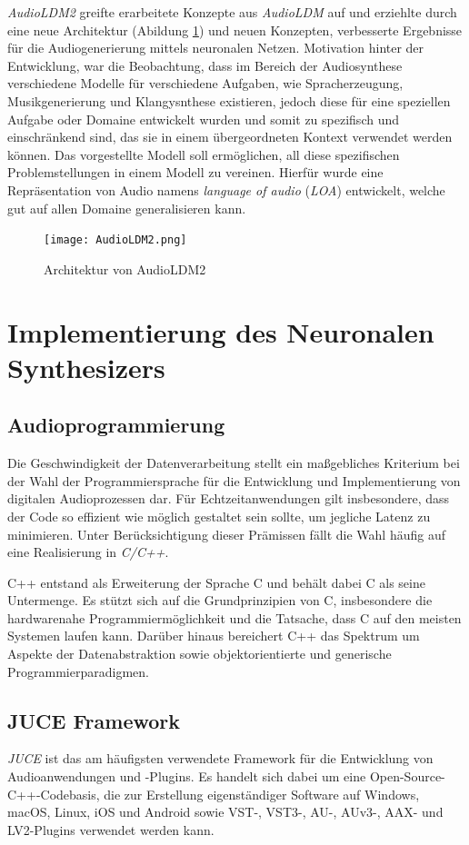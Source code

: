 \documentclass[
  a4paper,  %
  twoside,  %
  bibliography=totoc,
  headsepline,
  cleardoublepage=empty,
  parskip=half,
  draft=false
]{scrbook}
\begin{document}
\emph{AudioLDM2}\cite{liu_audioldm2_2023} greifte erarbeitete Konzepte aus \emph{AudioLDM}\cite{liu_audioldm_2023} auf und erziehlte durch eine neue Architektur (Abildung \ref{fig:AudioLDM2}) und neuen Konzepten, verbesserte Ergebnisse für die Audiogenerierung mittels neuronalen Netzen. Motivation hinter der Entwicklung, war die Beobachtung, dass im Bereich der Audiosynthese verschiedene Modelle für verschiedene Aufgaben, wie Spracherzeugung, Musikgenerierung und Klangysnthese existieren, jedoch diese für eine speziellen Aufgabe oder Domaine entwickelt wurden und somit zu spezifisch und einschränkend sind, das sie in einem übergeordneten Kontext verwendet werden können. Das vorgestellte Modell soll ermöglichen, all diese spezifischen Problemstellungen in einem Modell zu vereinen. Hierfür wurde eine Repräsentation von Audio namens \emph{language of audio} (\emph{LOA}) entwickelt, welche gut auf allen Domaine generalisieren kann.  
\begin{figure}[h]
  \centering
  \texttt{[image: AudioLDM2.png]}
  \caption[AudioLDM2 Architektur]{Architektur von AudioLDM2\cite{liu_audioldm2_2023}}
  \label{fig:AudioLDM2}
\end{figure} 


\section{Implementierung des Neuronalen Synthesizers}
\subsection{Audioprogrammierung}
Die Geschwindigkeit der Datenverarbeitung stellt ein maßgebliches Kriterium bei der Wahl der Programmiersprache für die Entwicklung und Implementierung von digitalen Audioprozessen dar. Für Echtzeitanwendungen gilt insbesondere, dass der Code so effizient wie möglich gestaltet sein sollte, um jegliche Latenz zu minimieren. Unter Berücksichtigung dieser Prämissen fällt die Wahl häufig auf eine Realisierung in \emph{C/C++}. \cite{doumler_c_2015, boulanger_audio_2011}

C++ entstand als Erweiterung der Sprache C und behält dabei C als seine Untermenge. Es stützt sich auf die Grundprinzipien von C, insbesondere die hardwarenahe Programmiermöglichkeit und die Tatsache, dass C auf den meisten Systemen laufen kann. Darüber hinaus bereichert C++ das Spektrum um Aspekte der Datenabstraktion sowie objektorientierte und generische Programmierparadigmen. \cite{stroustrup_c_1997}
\subsection{JUCE Framework}
\glqq\emph{JUCE} ist das am häufigsten verwendete Framework für die Entwicklung von Audioanwendungen und -Plugins. Es handelt sich dabei um eine Open-Source-C++-Codebasis, die zur Erstellung eigenständiger Software auf Windows, macOS, Linux, iOS und Android sowie VST-, VST3-, AU-, AUv3-, AAX- und LV2-Plugins verwendet werden kann.\grqq \cite{noauthor_juce_nodate-1}
\end{document}
